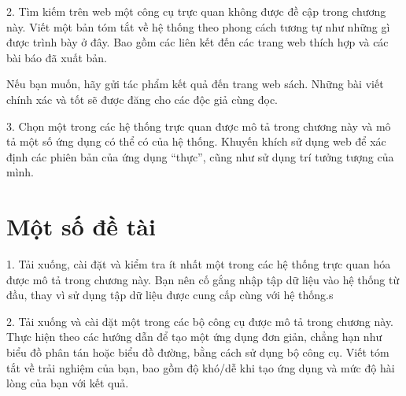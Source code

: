 \documentclass[13pt]{scrartcl} %
\begin{document}
2. Tìm kiếm trên web một công cụ trực quan không được đề cập trong chương này. Viết một bản tóm tắt về hệ thống theo phong cách tương tự như những gì được trình bày ở đây. Bao gồm các liên kết đến các trang web thích hợp và các bài báo đã xuất bản.

Nếu bạn muốn, hãy gửi tác phẩm kết quả đến trang web sách. Những bài viết chính xác và tốt sẽ được đăng cho các độc giả cùng đọc.

3. Chọn một trong các hệ thống trực quan được mô tả trong chương này và mô tả một số ứng dụng có thể có của hệ thống. Khuyến khích sử dụng web để xác định các phiên bản của ứng dụng “thực”, cũng như sử dụng trí tưởng tượng của mình.

\section{Một số đề tài }
1. Tải xuống, cài đặt và kiểm tra ít nhất một trong các hệ thống trực quan hóa được mô tả trong chương này. Bạn nên cố gắng nhập tập dữ liệu vào hệ thống từ đầu, thay vì sử dụng tập dữ liệu được cung cấp cùng với hệ thống.s

2. Tải xuống và cài đặt một trong các bộ công cụ được mô tả trong chương này. Thực hiện theo các hướng dẫn để tạo một ứng dụng đơn giản, chẳng hạn như biểu đồ phân tán hoặc biểu đồ đường, bằng cách sử dụng bộ công cụ. Viết tóm tắt về trải nghiệm của bạn, bao gồm độ khó/dễ khi tạo ứng dụng và mức độ hài lòng của bạn với kết quả.
\end{document}
